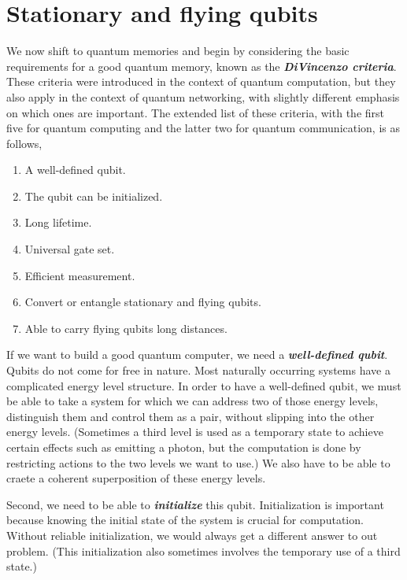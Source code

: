 \section{Stationary and flying qubits}
\label{sec:statinary-and-flying-qubits}

We now shift to quantum memories and begin by considering the basic requirements for a good quantum memory, known as the \textbf{\emph{DiVincenzo criteria}}.
These criteria were introduced in the context of quantum computation, but they also apply in the context of quantum networking, with slightly different emphasis on which ones are important.
The extended list of these criteria, with the first five for quantum computing and the latter two for quantum communication, is as follows,
\begin{enumerate}
    \item A well-defined qubit.
    \item The qubit can be initialized.
    \item Long lifetime.
    \item Universal gate set.
    \item Efficient measurement.
    \item Convert or entangle stationary and flying qubits.
    \item Able to carry flying qubits long distances.
\end{enumerate}

If we want to build a good quantum computer, we need a \textbf{\emph{well-defined qubit}}.
Qubits do not come for free in nature.
Most naturally occurring systems have a complicated energy level structure.
In order to have a well-defined qubit, we must be able to take a system for which we can address two of those energy levels, distinguish them and control them as a pair, without slipping into the other energy levels.
(Sometimes a third level is used as a temporary state to achieve certain effects such as emitting a photon, but the computation is done by restricting actions to the two levels we want to use.)
We also have to be able to craete a coherent superposition of these energy levels.

Second, we need to be able to \textbf{\emph{initialize}} this qubit.
Initialization is important because knowing the initial state of the system is crucial for computation.
Without reliable initialization, we would always get a different answer to out problem.
(This initialization also sometimes involves the temporary use of a third state.)

